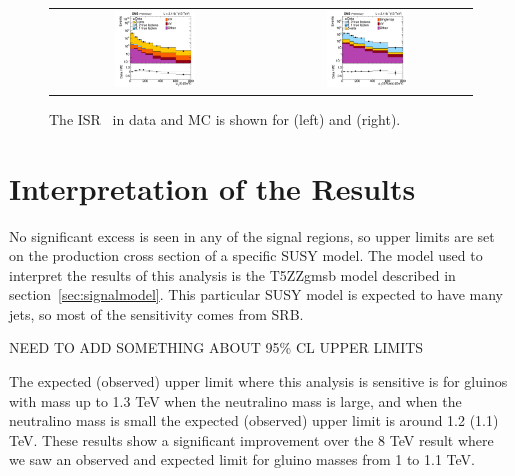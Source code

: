 \begin{figure}[!ht]
\begin{center}
\begin{tabular}{cc}
\includegraphics[width=0.4\textwidth]{results/figs/CMS-PAS-SUS-15-007_Figure_010-a.pdf} &
\includegraphics[width=0.4\textwidth]{results/figs/CMS-PAS-SUS-15-007_Figure_010-b.pdf} \\
\end{tabular}
\caption{
\label{fig:isrmodeling}
The ISR \pt\ in data and MC is shown for \zjets(left) and \ttbar(right).
}
\end{center}
\end{figure}

\clearpage

\section{Interpretation of the Results}
No significant excess is seen in any of the signal regions, so upper limits are set on the production cross section of a specific SUSY model.
The model used to interpret the results of this analysis is the T5ZZgmsb model described in section~\ref{sec:signalmodel}.
This particular SUSY model is expected to have many jets, so most of the sensitivity comes from SRB.

NEED TO ADD SOMETHING ABOUT 95\% CL UPPER LIMITS

The expected (observed) upper limit where this analysis is sensitive is for gluinos with mass up to 1.3 TeV when the neutralino mass is large,
and when the neutralino mass is small the expected (observed) upper limit is around 1.2 (1.1) TeV.
These results show a significant improvement over the 8 TeV result where we saw an observed and expected limit for gluino masses from 1 to 1.1 TeV.


